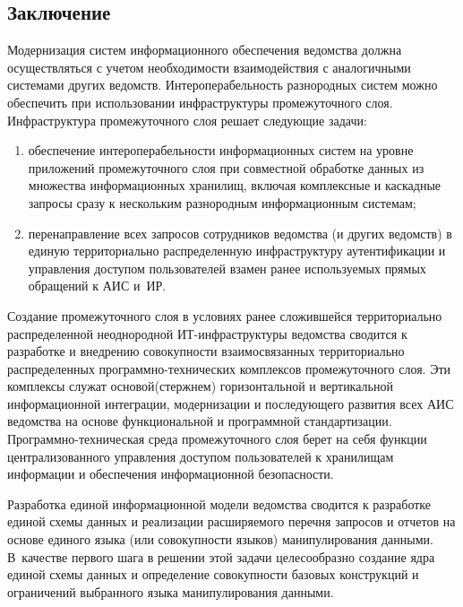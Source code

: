 \begin{multicols}{2}
\section{Заключение}

      Модернизация систем информационного обес\-пе\-че\-ния ведомства должна 
осуществляться с\linebreak
учетом необходимости взаимодействия с аналогичными системами других 
ведомств. Интероперабельность разнородных систем можно обеспечить при использовании 
инфраструктуры промежуточного слоя. Инфраструктура промежуточного слоя решает 
следующие задачи:
      \begin{enumerate}[(1)]
\item  обеспечение интероперабельности информационных систем на уровне приложений 
промежуточного слоя при совместной обработке данных из множества информационных 
хранилищ, включая комплексные и каскадные запросы сразу к нескольким разнородным 
информационным системам;
      \item перенаправление всех запросов сотрудников ведомства (и других ведомств) в 
единую территориально распределенную инфраструктуру аутентификации и управления 
доступом пользователей взамен ранее используемых прямых обращений к АИС и~ИР.
      \end{enumerate}
      
      Создание промежуточного слоя в условиях ранее сложившейся территориально 
распределенной неоднородной ИТ-ин\-фра\-струк\-ту\-ры ведомства\linebreak
 сводится к разработке и 
внедрению совокупности взаимосвязанных территориально распределенных 
прог\-рам\-мно-тех\-ни\-че\-ских комплексов промежуточного слоя. Эти комплексы служат 
основой\linebreak (стержнем) горизонтальной и вертикальной информационной интеграции, 
модернизации и последующего развития всех АИС ведомства на\linebreak
 основе функциональной и 
программной стандартизации. Программно-тех\-ни\-че\-ская среда промежуточного слоя берет на 
себя функции централизованного управления доступом пользователей к хранилищам 
информации и обеспечения информационной безопасности.
      
      Разработка единой информационной модели ведомства сводится к разработке единой 
схемы данных и реализации расширяемого перечня запросов и отчетов на основе единого 
языка (или со\-во\-куп\-ности языков) манипулирования данными. В~качестве первого шага в 
решении этой задачи целесообразно создание ядра единой схемы данных и определение 
совокупности базовых конструкций и ограничений выбранного языка манипулирования 
данными.
      

\end{multicols}
